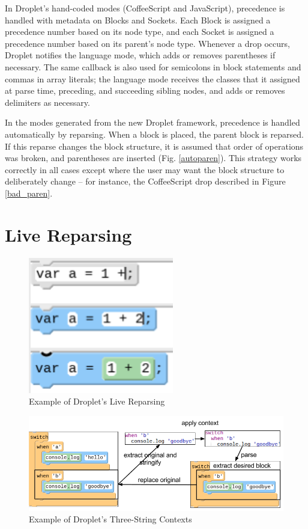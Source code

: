 \documentclass[conference]{IEEEtran}
\begin{document}
In Droplet's hand-coded modes (CoffeeScript and JavaScript), precedence is handled with metadata on Blocks and Sockets. Each Block is assigned a precedence number based on its node type, and each Socket is assigned a precedence number based on its parent's node type. Whenever a drop occurs, Droplet notifies the language mode, which adds or removes parentheses if necessary. The same callback is also used for semicolons in block statements and commas in array literals; the language mode receives the classes that it assigned at parse time, preceding, and succeeding sibling nodes, and adds or removes delimiters as necessary.

In the modes generated from the new Droplet framework, precedence is handled automatically by reparsing. When a block is placed, the parent block is reparsed. If this reparse changes the block structure, it is assumed that order of operations was broken, and parentheses are inserted (Fig. \ref{autoparen}). This strategy works correctly in all cases except where the user may want the block structure to deliberately change -- for instance, the CoffeeScript drop described in Figure \ref{bad_paren}.

\section{Live Reparsing}
\begin{figure}
\centering
\includegraphics[width=2.5in]{livereparse.png}
\caption{Example of Droplet's Live Reparsing}
\label{livereparse}
\end{figure}

\begin{figure}
\centering
\includegraphics[width=5in]{threeparse.png}
\caption{Example of Droplet's Three-String Contexts}
\label{threeparse}
\end{figure}
\end{document}
